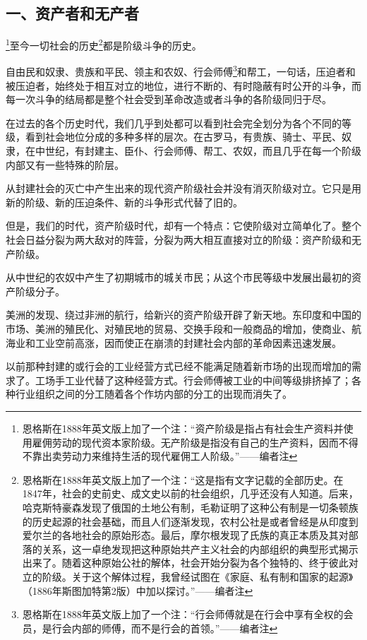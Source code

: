 \documentclass[UTF8,zihao=-4,a4paper]{ctexart}
\begin{document}
\subsection*{一、资产者和无产者}
\footnote{恩格斯在1888年英文版上加了一个注：“资产阶级是指占有社会生产资料并使用雇佣劳动的现代资本家阶级。无产阶级是指没有自己的生产资料，因而不得不靠出卖劳动力来维持生活的现代雇佣工人阶级。”——编者注}至今一切社会的历史\footnote{恩格斯在1888年英文版上加了一个注：“这是指有文字记载的全部历史。在1847年，社会的史前史、成文史以前的社会组织，几乎还没有人知道。后来，哈克斯特豪森发现了俄国的土地公有制，毛勒证明了这种公有制是一切条顿族的历史起源的社会基础，而且人们逐渐发现，农村公社是或者曾经是从印度到爱尔兰的各地社会的原始形态。最后，摩尔根发现了氏族的真正本质及其对部落的关系，这一卓绝发现把这种原始共产主义社会的内部组织的典型形式揭示出来了。随着这种原始公社的解体，社会开始分裂为各个独特的、终于彼此对立的阶级。关于这个解体过程，我曾经试图在《家庭、私有制和国家的起源》（1886年斯图加特第2版）中加以探讨。”——编者注}都是阶级斗争的历史。\par
自由民和奴隶、贵族和平民、领主和农奴、行会师傅\footnote{恩格斯在1888年英文版上加了一个注：“行会师傅就是在行会中享有全权的会员，是行会内部的师傅，而不是行会的首领。”——编者注}和帮工，一句话，压迫者和被压迫者，始终处于相互对立的地位，进行不断的、有时隐蔽有时公开的斗争，而每一次斗争的结局都是整个社会受到革命改造或者斗争的各阶级同归于尽。\par
在过去的各个历史时代，我们几乎到处都可以看到社会完全划分为各个不同的等级，看到社会地位分成的多种多样的层次。在古罗马，有贵族、骑士、平民、奴隶，在中世纪，有封建主、臣仆、行会师傅、帮工、农奴，而且几乎在每一个阶级内部又有一些特殊的阶层。\par
从封建社会的灭亡中产生出来的现代资产阶级社会并没有消灭阶级对立。它只是用新的阶级、新的压迫条件、新的斗争形式代替了旧的。\par
但是，我们的时代，资产阶级时代，却有一个特点：它使阶级对立简单化了。整个社会日益分裂为两大敌对的阵营，分裂为两大相互直接对立的阶级：资产阶级和无产阶级。\par
从中世纪的农奴中产生了初期城市的城关市民；从这个市民等级中发展出最初的资产阶级分子。\par
美洲的发现、绕过非洲的航行，给新兴的资产阶级开辟了新天地。东印度和中国的市场、美洲的殖民化、对殖民地的贸易、交换手段和一般商品的增加，使商业、航海业和工业空前高涨，因而使正在崩溃的封建社会内部的革命因素迅速发展。\par
以前那种封建的或行会的工业经营方式已经不能满足随着新市场的出现而增加的需求了。工场手工业代替了这种经营方式。行会师傅被工业的中间等级排挤掉了；各种行业组织之间的分工随着各个作坊内部的分工的出现而消失了。\par
\end{document}
